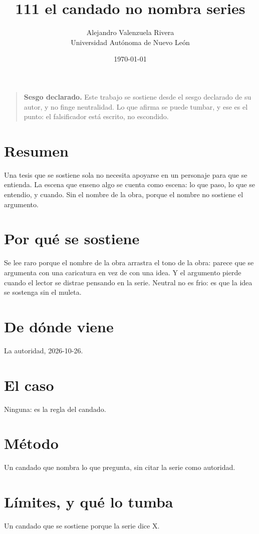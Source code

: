 \documentclass[11pt,a4paper]{article}
\title{111 el candado no nombra series}
\author{Alejandro Valenzuela Rivera\\\small Universidad Autónoma de Nuevo León}
\date{\today}
\begin{document}
\maketitle

\begin{quote}
\textbf{Sesgo declarado.} Este trabajo se sostiene desde el sesgo declarado de su autor, y no finge neutralidad. Lo que afirma se puede tumbar, y ese es el punto: el falsificador está escrito, no escondido.
\end{quote}

\section*{Resumen}
Una tesis que se sostiene sola no necesita apoyarse en un personaje para que se entienda. La escena que enseno algo se cuenta como escena: lo que paso, lo que se entendio, y cuando. Sin el nombre de la obra, porque el nombre no sostiene el argumento.

\section{Por qué se sostiene}
Se lee raro porque el nombre de la obra arrastra el tono de la obra: parece que se argumenta con una caricatura en vez de con una idea. Y el argumento pierde cuando el lector se distrae pensando en la serie. Neutral no es frio: es que la idea se sostenga sin el muleta.

\section{De dónde viene}
La autoridad, 2026-10-26.

\section{El caso}
Ninguna: es la regla del candado.

\section{Método}
Un candado que nombra lo que pregunta, sin citar la serie como autoridad.

\section{Límites, y qué lo tumba}
Un candado que se sostiene porque la serie dice X.
\end{document}
